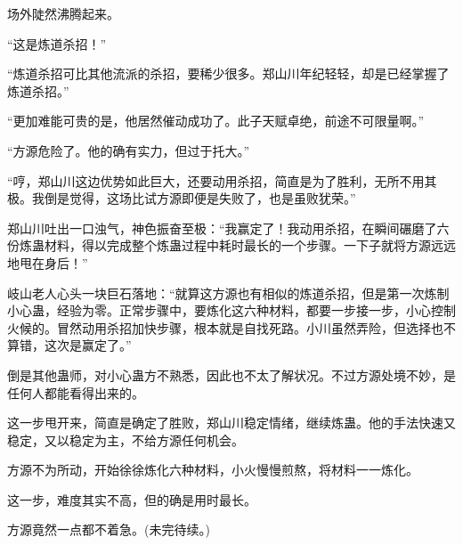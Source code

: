 \begin{this_body}
场外陡然沸腾起来。

“这是炼道杀招！”

“炼道杀招可比其他流派的杀招，要稀少很多。郑山川年纪轻轻，却是已经掌握了炼道杀招。”

“更加难能可贵的是，他居然催动成功了。此子天赋卓绝，前途不可限量啊。”

“方源危险了。他的确有实力，但过于托大。”

“哼，郑山川这边优势如此巨大，还要动用杀招，简直是为了胜利，无所不用其极。我倒是觉得，这场比试方源即便是失败了，也是虽败犹荣。”

郑山川吐出一口浊气，神色振奋至极：“我赢定了！我动用杀招，在瞬间碾磨了六份炼蛊材料，得以完成整个炼蛊过程中耗时最长的一个步骤。一下子就将方源远远地甩在身后！”

岐山老人心头一块巨石落地：“就算这方源也有相似的炼道杀招，但是第一次炼制小心蛊，经验为零。正常步骤中，要炼化这六种材料，都要一步接一步，小心控制火候的。冒然动用杀招加快步骤，根本就是自找死路。小川虽然弄险，但选择也不算错，这次是赢定了。”

倒是其他蛊师，对小心蛊方不熟悉，因此也不太了解状况。不过方源处境不妙，是任何人都能看得出来的。

这一步甩开来，简直是确定了胜败，郑山川稳定情绪，继续炼蛊。他的手法快速又稳定，又以稳定为主，不给方源任何机会。

方源不为所动，开始徐徐炼化六种材料，小火慢慢煎熬，将材料一一炼化。

这一步，难度其实不高，但的确是用时最长。

方源竟然一点都不着急。(未完待续。)

\end{this_body}

